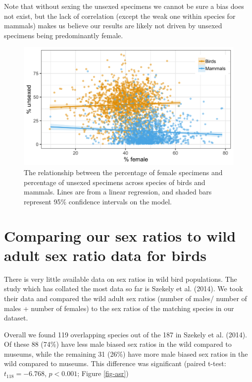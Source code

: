 \documentclass[a4paper, 12pt]{article}
\begin{document}
Note that without sexing the unsexed specimens we cannot be sure a bias does not exist, but the lack of correlation (except the weak one within species for mammals) makes us believe our results are likely not driven by unsexed specimens being predominantly female.

\begin{figure}[H]
 \centering
  \includegraphics[width = \linewidth]{figures/nosex-binomial-correlation.png}
  \caption{The relationship between the percentage of female specimens and percentage of unsexed specimens across species of birds and mammals.
  Lines are from a linear regression, and shaded bars represent 95\% confidence intervals on the model.}
  \label{fig-nosex-correlation2}
\end{figure}

\newpage
\section{Comparing our sex ratios to wild adult sex ratio data for birds}

There is very little available data on sex ratios in wild bird populations. The study which has collated the most data so far is Szekely et al. (2014). We took their data and compared the wild adult sex ratios (number of males/ number of males + number of females) to the sex ratios of the matching species in our dataset.

Overall we found 119 overlapping species out of the 187 in Szekely et al. (2014)\cite{szekely2014sex}.
Of these 88 (74\%) have less male biased sex ratios in the wild compared to museums, while the remaining 31 (26\%) have more male biased sex ratios in the wild compared to museums. 
This difference was significant (paired t-test: $t_{118} = -6.768$, $p < 0.001$; Figure \ref{fig-asr})
\end{document}
